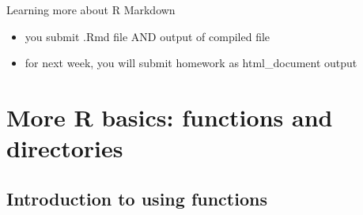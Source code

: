 \documentclass[8pt,ignorenonframetext,dvipsnames]{beamer}
\providecommand{\tightlist}{%
  \setlength{\itemsep}{0pt}\setlength{\parskip}{0pt}}
\let\olditem\item
\renewcommand{\item}{%
  \olditem\vspace{4pt}
}
\begin{document}
\begin{frame}{Learning more about R Markdown}
\begin{itemize}
  \begin{itemize}
  \tightlist
  \item
    you submit .Rmd file AND output of compiled file
  \item
    for next week, you will submit homework as html\_document output
  \end{itemize}
\end{itemize}

\end{frame}

\section{More R basics: functions and
directories}\label{more-r-basics-functions-and-directories}

\subsection{Introduction to using
functions}\label{introduction-to-using-functions}
\end{document}

